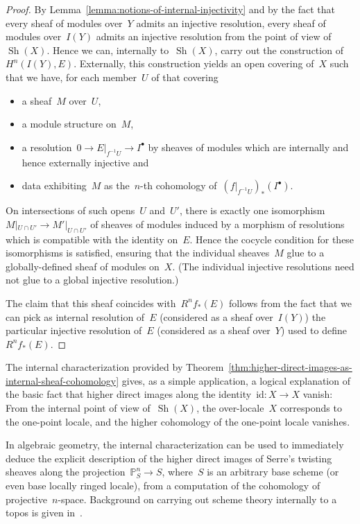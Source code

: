 \documentclass[oneside]{amsart}
\theoremstyle{definition}
\theoremstyle{plain}
\theoremstyle{remark}
\DeclareMathOperator{\Sh}{Sh}
\renewcommand{\_}{\mathpunct{.}\,}
\begin{document}
\begin{proof}By Lemma~\ref{lemma:notions-of-internal-injectivity} and by the
fact that every sheaf of modules over~$Y$ admits an injective resolution, every sheaf
of modules over~$I(Y)$ admits an injective resolution from the point of view
of~$\Sh(X)$. Hence we can, internally to~$\Sh(X)$, carry out the construction of~$H^n(I(Y), E)$.
Externally, this construction yields an open covering of~$X$ such that we have, for each
member~$U$ of that covering
\begin{itemize}
\item a sheaf~$M$ over~$U$,
\item a module structure on~$M$,
\item a resolution~$0 \to E|_{f^{-1}U} \to I^\bullet$ by sheaves of modules which are
internally and hence externally injective and
\item data exhibiting~$M$ as the~$n$-th cohomology
of~$(f|_{f^{-1}U})_*(I^\bullet)$.
\end{itemize}
On intersections of such opens~$U$ and~$U'$, there is exactly one
isomorphism~$M|_{U \cap U'} \to M'|_{U \cap U'}$ of sheaves of modules induced by
a morphism of resolutions which is compatible with the identity on~$E$.
Hence the cocycle condition for these isomorphisms is satisfied, ensuring that
the individual sheaves~$M$ glue to a globally-defined sheaf of modules on~$X$.
(The individual injective resolutions need not glue to a global injective
resolution.)

The claim that this sheaf coincides with~$R^n f_*(E)$ follows from the fact
that we can pick as internal resolution of~$E$ (considered as a sheaf
over~$I(Y)$) the particular injective resolution of~$E$ (considered as a sheaf
over~$Y$) used to define~$R^n f_*(E)$.
\end{proof}

The internal characterization provided by
Theorem~\ref{thm:higher-direct-images-as-internal-sheaf-cohomology} gives, as a
simple application, a logical explanation of the basic fact that higher direct images along
the identity~$\mathrm{id} : X \to X$ vanish: From the internal point of view
of~$\Sh(X)$, the over-locale~$X$ corresponds to the one-point locale, and the
higher cohomology of the one-point locale vanishes.

In algebraic geometry, the internal characterization can be used to immediately
deduce the explicit description of the higher direct images of Serre's twisting
sheaves along the projection~$\mathbb{P}^n_S \to S$, where~$S$ is an arbitrary
base scheme (or even base locally ringed locale), from a computation of the
cohomology of projective~$n$-space. Background on carrying out scheme
theory internally to a topos is given in~\cite[Section~12]{blechschmidt:phd}.
\end{document}

